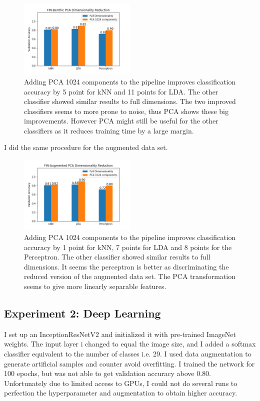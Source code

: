 \begin{figure}[H]
    \centering
    \includegraphics[width=0.5\textwidth]{figures/pca_improvement.png}
    \ContinuedFloat
    \caption[]{Adding PCA 1024 components to the pipeline improves classification accuracy by 5 point for kNN and 11 points for LDA. The other classifier showed similar results to full dimensions. The two improved classifiers seems to more prone to noise, thus PCA shows these big improvements. However PCA might still be useful for the other classifiers as it reduces training time by a large margin.}
    \label{fig:pca_improve}
\end{figure}

I did the same procedure for the augmented data set. 

\begin{figure}[H]
    \centering
    \includegraphics[width=0.5\textwidth]{figures/pca__concat_improvement.png}
    \ContinuedFloat
    \caption[]{Adding PCA 1024 components to the pipeline improves classification accuracy by 1 point for kNN, 7 points for LDA and 8 points for the Perceptron. The other classifier showed similar results to full dimensions. It seems the perceptron is better as discriminating the reduced version of the augmented data set. The PCA transformation seems to give more linearly separable features.}
    \label{fig:pca_concat_improve}
\end{figure}

\subsection*{Experiment 2: Deep Learning}

I set up an InceptionResNetV2 and initialized it with pre-trained ImageNet weights. The input layer i changed to equal the image size, and I added a softmax classifier equivalent to the number of classes i.e. 29. I used data augmentation to generate artificial samples and counter avoid overfitting. I trained the network for 100 epochs, but was not able to get validation accuracy above 0.80. Unfortunately due to limited access to GPUs, I could not do several runs to perfection the hyperparameter and augmentation to obtain higher accuracy. 
